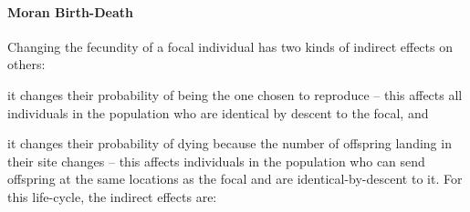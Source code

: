 \documentclass[11pt, letterpaper]{article}
\begin{document}
\paragraph{Moran Birth-Death} Changing the fecundity of a focal individual has two kinds of indirect effects on others: \begin{inparaenum}[\it i\rm )]\item it changes their probability of being the one chosen to reproduce -- this affects all individuals in the population who are identical by descent to the focal, and \item it changes their probability of dying because the number of offspring landing in their site changes -- this affects individuals in the population who can send offspring at the same locations as the focal and are identical-by-descent to it. For this life-cycle, the indirect effects are: \end{inparaenum}
%
\end{document}

